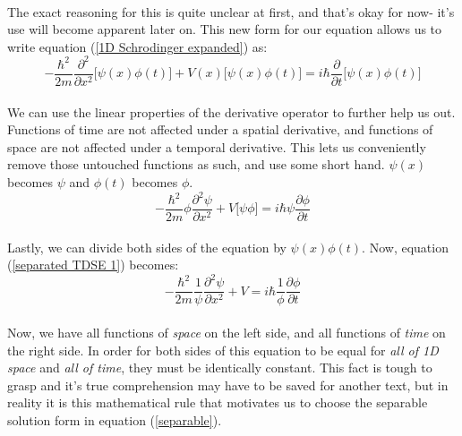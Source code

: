 \documentclass[12pt,letterpaper]{book}
\begin{document}
\paragraph*{}The exact reasoning for this is quite unclear at first, and that's okay for now- it's use will become apparent later on. This new form for our equation allows us to write equation (\ref{1D Schrodinger expanded}) as:
\begin{equation}
\label{separated TDSE 0}
-\frac{\hbar^2}{2m}\frac{\partial^2}{\partial x^2}\Big[ \psi(x)\phi(t) \Big] +
V(x)\Big[ \psi(x)\phi(t) \Big] = i\hbar\frac{\partial}{\partial t}\Big[ \psi(x)\phi(t) \Big]
\end{equation}
\paragraph*{}We can use the linear properties of the derivative operator to further help us out. Functions of time are not affected under a spatial derivative, and functions of space are not affected under a temporal derivative. This lets us conveniently remove those untouched functions as such, and use some short hand. $\psi(x)$ becomes $\psi$ and $\phi(t)$ becomes $\phi$.
\begin{equation}
\label{separated TDSE 1}
-\frac{\hbar^2}{2m}\phi\frac{\partial^2\psi}{\partial x^2} +
V\big[ \psi\phi \big] = 
i\hbar\psi\frac{\partial \phi}{\partial t}
\end{equation}
\paragraph*{}Lastly, we can divide both sides of the equation by $\psi(x)\phi(t)$. Now, equation (\ref{separated TDSE 1}) becomes:
\begin{equation}
\label{separated TDSE 2}
-\frac{\hbar^2}{2m}\frac{1}{\psi}\frac{\partial^2\psi}{\partial x^2} + V = 
i\hbar \frac{1}{\phi}\frac{\partial \phi}{\partial t}
\end{equation}
\paragraph*{}Now, we have all functions of \textit{space} on the left side, and all functions of \textit{time} on the right side. In order for both sides of this equation to be equal for \textit{all of 1D space} and \textit{all of time}, they must be identically constant. This fact is tough to grasp and it's true comprehension may have to be saved for another text, but in reality it is this mathematical rule that motivates us to choose the separable solution form in equation (\ref{separable}).
\end{document}
